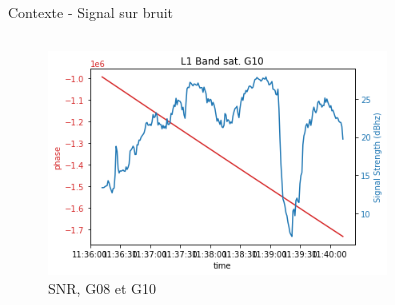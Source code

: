 \documentclass[xcolor=dvipsnames,envcountsect]{beamer}
\begin{document}
\begin{frame}{Contexte - Signal sur bruit}
\begin{columns}
\begin{column}{0.5\textwidth}
\begin{figure}
				\includegraphics[width=0.8\textwidth]{./Figures/G10_L1.png}
				\caption {SNR, G08 et G10}
			\end{figure}
		\end{column}
	\end{columns}
\end{frame}
\end{document}
